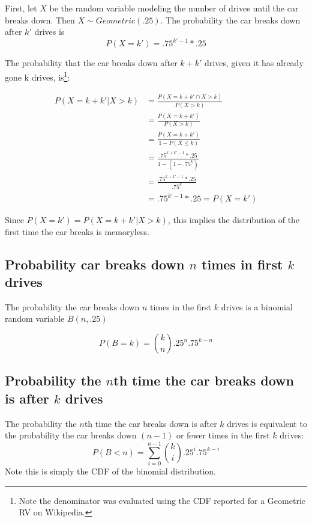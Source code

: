 \documentclass[paper=a4, fontsize=11pt]{scrartcl} %
\numberwithin{equation}{section} %
\numberwithin{figure}{section} %
\numberwithin{table}{section} %
\begin{document}
First, let $X$ be the random variable modeling the number of drives until the car breaks down. Then $X \sim Geometric(.25)$. The probability the car breaks down after $k'$ drives is
\begin{equation*}
P(X = k') = .75^{k'-1} * .25
\end{equation*}

The probability that the car breaks down after $k+k'$ drives, given it has already gone k drives, is\footnote{Note the denominator was evaluated using the CDF reported for a Geometric RV on Wikipedia.}:

\begin{align*}
P(X = k + k' | X > k)& = \frac{P(X = k + k' \cap X > k)}{P(X>k)}\\
   & =\frac{P(X = k + k')}{P(X>k)}\\
   & =\frac{P(X = k + k')}{1-P(X \leq k)}\\
   & =\frac{.75^{k+k'-1}*.25}{1-(1-.75^k)}\\
   & = \frac{.75^{k+k'-1}*.25}{.75^k}\\
   & = .75^{k'-1}*.25 = P(X = k') 
\end{align*}

Since $P(X = k') = P(X = k + k' | X > k)$, this implies the distribution of the first time the car breaks is memoryless.
   
\subsection{Probability car breaks down $n$ times in first $k$ drives}

The probability the car breaks down $n$ times in the first $k$ drives is a binomial random variable $B(n,.25)$

\begin{equation*}
P(B = k) = {k \choose n} .25^n .75^{k-n}
\end{equation*}

\subsection{Probability the $n$th time the car breaks down is after $k$ drives}

The probability the $n$th time the car breaks down is after $k$ drives is equivalent to the probability the car breaks down $(n-1)$ or fewer times in the first $k$ drives:
\begin{equation*}
P(B < n) = \sum_{i=0}^{n-1}{k \choose i} .25^i .75^{k-i}
\end{equation*}
Note this is simply the CDF of the binomial distribution.
\end{document}
